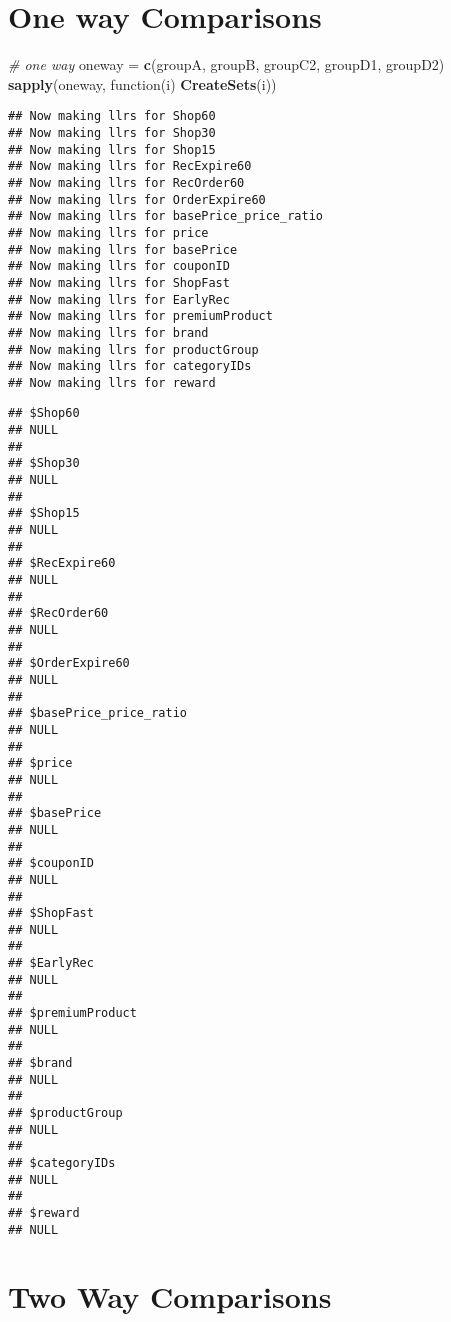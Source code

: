 \documentclass[10pt]{report}
\newenvironment{Shaded}{}{}
\newcommand{\KeywordTok}[1]{\textcolor[rgb]{0.00,0.44,0.13}{\textbf{{#1}}}}
\newcommand{\DecValTok}[1]{\textcolor[rgb]{0.25,0.63,0.44}{{#1}}}
\newcommand{\StringTok}[1]{\textcolor[rgb]{0.25,0.44,0.63}{{#1}}}
\newcommand{\CommentTok}[1]{\textcolor[rgb]{0.38,0.63,0.69}{\textit{{#1}}}}
\newcommand{\NormalTok}[1]{{#1}}
\begin{document}
\section{One way Comparisons}\label{one-way-comparisons}

\begin{Shaded}
\begin{Highlighting}[]
\CommentTok{# one way}
\NormalTok{oneway =}\StringTok{ }\KeywordTok{c}\NormalTok{(groupA, groupB, groupC2, groupD1, groupD2)}
\KeywordTok{sapply}\NormalTok{(oneway, function(i) }\KeywordTok{CreateSets}\NormalTok{(i))}
\end{Highlighting}
\end{Shaded}

\begin{verbatim}
## Now making llrs for Shop60
## Now making llrs for Shop30
## Now making llrs for Shop15
## Now making llrs for RecExpire60
## Now making llrs for RecOrder60
## Now making llrs for OrderExpire60
## Now making llrs for basePrice_price_ratio
## Now making llrs for price
## Now making llrs for basePrice
## Now making llrs for couponID
## Now making llrs for ShopFast
## Now making llrs for EarlyRec
## Now making llrs for premiumProduct
## Now making llrs for brand
## Now making llrs for productGroup
## Now making llrs for categoryIDs
## Now making llrs for reward
\end{verbatim}

\begin{verbatim}
## $Shop60
## NULL
## 
## $Shop30
## NULL
## 
## $Shop15
## NULL
## 
## $RecExpire60
## NULL
## 
## $RecOrder60
## NULL
## 
## $OrderExpire60
## NULL
## 
## $basePrice_price_ratio
## NULL
## 
## $price
## NULL
## 
## $basePrice
## NULL
## 
## $couponID
## NULL
## 
## $ShopFast
## NULL
## 
## $EarlyRec
## NULL
## 
## $premiumProduct
## NULL
## 
## $brand
## NULL
## 
## $productGroup
## NULL
## 
## $categoryIDs
## NULL
## 
## $reward
## NULL
\end{verbatim}

\section{Two Way Comparisons}\label{two-way-comparisons}

\begin{Shaded}
\end{Shaded}
\end{document}
